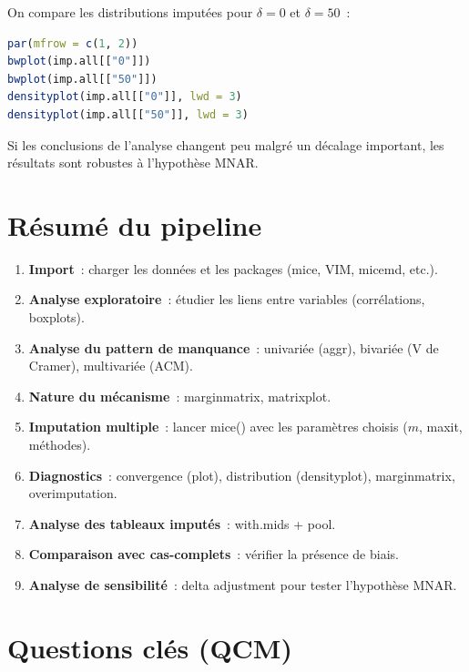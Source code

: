 \documentclass[a4paper,11pt]{article}
\theoremstyle{definition}
\theoremstyle{remark}
\begin{document}
On compare les distributions imput\'ees pour $\delta = 0$ et
$\delta = 50$~:

\begin{lstlisting}[language=R]
par(mfrow = c(1, 2))
bwplot(imp.all[["0"]])
bwplot(imp.all[["50"]])
densityplot(imp.all[["0"]], lwd = 3)
densityplot(imp.all[["50"]], lwd = 3)
\end{lstlisting}

Si les conclusions de l'analyse changent peu malgr\'e un d\'ecalage
important, les r\'esultats sont robustes \`a l'hypoth\`ese MNAR.

\section{R\'esum\'e du pipeline}

\begin{enumerate}
  \item \textbf{Import}~: charger les donn\'ees et les packages
    (mice, VIM, micemd, etc.).
  \item \textbf{Analyse exploratoire}~: \'etudier les liens entre
    variables (corr\'elations, boxplots).
  \item \textbf{Analyse du pattern de manquance}~: univari\'ee
    (aggr), bivari\'ee (V de Cramer), multivari\'ee (ACM).
  \item \textbf{Nature du m\'ecanisme}~: marginmatrix, matrixplot.
  \item \textbf{Imputation multiple}~: lancer mice() avec les
    param\`etres choisis ($m$, maxit, m\'ethodes).
  \item \textbf{Diagnostics}~: convergence (plot), distribution
    (densityplot), marginmatrix, overimputation.
  \item \textbf{Analyse des tableaux imput\'es}~: with.mids + pool.
  \item \textbf{Comparaison avec cas-complets}~: v\'erifier la
    pr\'esence de biais.
  \item \textbf{Analyse de sensibilit\'e}~: delta adjustment pour
    tester l'hypoth\`ese MNAR.
\end{enumerate}

\section*{Questions cl\'es (QCM)}
\end{document}
